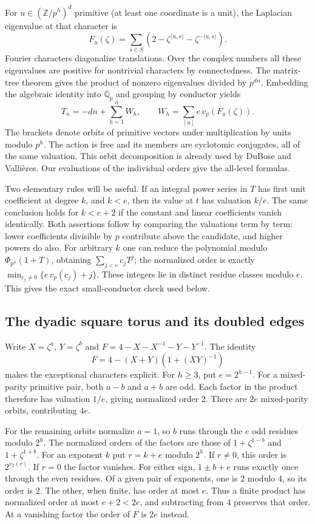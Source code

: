 For $u\in(\mathbb Z/p^h)^d$ primitive (at least one coordinate is a unit),
the Laplacian eigenvalue at that character is
\[
 F_u(\zeta)=\sum_{s\in S}(2-\zeta^{\langle u,s\rangle}
                                  -\zeta^{-\langle u,s\rangle}).
\]
Fourier characters diagonalize translations. Over the complex numbers all
these eigenvalues are positive for nontrivial characters by connectedness.
The matrix-tree theorem gives the product of nonzero eigenvalues divided by
$p^{dn}$. Embedding the algebraic identity into $\overline{\mathbb Q}_p$
and grouping by conductor yields
\begin{equation}\label{eq:shells}
 T_n=-dn+\sum_{h=1}^n W_h,\qquad
 W_h=\sum_{[u]} e\,v_p(F_u(\zeta)).
\end{equation}
The brackets denote orbits of primitive vectors under multiplication by units
modulo $p^h$. The action is free and its members are cyclotomic conjugates,
all of the same valuation. This orbit decomposition is already used by
DuBose and Vallières. Our evaluations of the individual orders give the
all-level formulas.

Two elementary rules will be useful. If an integral power series in $T$
has first unit coefficient at degree $k$, and $k<e$, then its value at
$t$ has valuation $k/e$. The same conclusion holds for $k<e+2$ if the
constant and linear coefficients vanish identically. Both assertions follow
by comparing the valuations term by term: lower coefficients divisible by
$p$ contribute above the candidate, and higher powers do also. For arbitrary
$k$ one can reduce the polynomial modulo $\Phi_{p^h}(1+T)$, obtaining
$\sum_{j<e}c_jT^j$; the normalized order is exactly
$\min_{c_j\ne0}\{e\,v_p(c_j)+j\}$. These integers lie in distinct residue
classes modulo $e$. This gives the exact small-conductor check used below.

\subsection{The dyadic square torus and its doubled edges}
Write $X=\zeta^a$, $Y=\zeta^b$ and $F=4-X-X^{-1}-Y-Y^{-1}$.
The identity
\[
 F=4-(X+Y)(1+(XY)^{-1})
\]
makes the exceptional characters explicit. For $h\ge3$, put $e=2^{h-1}$.
For a mixed-parity primitive pair, both $a-b$ and $a+b$ are odd.
Each factor in the product therefore has valuation $1/e$, giving normalized
order $2$. There are $2e$ mixed-parity orbits, contributing $4e$.

For the remaining orbits normalize $a=1$, so $b$ runs through the $e$ odd
residues modulo $2^h$. The normalized orders of the factors are those of
$1+\zeta^{1-b}$ and $1+\zeta^{1+b}$. For an exponent $k$ put $r=k+e$
modulo $2^h$. If $r\ne0$, this order is $2^{v_2(r)}$. If $r=0$ the factor
vanishes. For either sign, $1\pm b+e$ runs exactly once through the even
residues. Of a given pair of exponents, one is $2$ modulo $4$, so its order
is $2$. The other, when finite, has order at most $e$.
Thus a finite product has normalized order at most $e+2<2e$, and subtracting
from $4$ preserves that order. At a vanishing factor the order of $F$ is
$2e$ instead.

